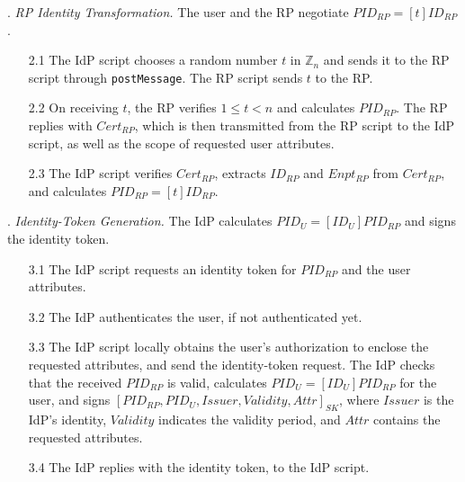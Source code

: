 . {\em RP Identity Transformation.}
The user and the RP negotiate $PID_{RP} = [t]{ID_{RP}}$.
\vspace{-\topsep}
\begin{itemize}
\setlength{\topsep}{0pt}
\setlength{\partopsep}{0pt}
\setlength{\itemsep}{0pt}
\setlength{\parsep}{0pt}
\setlength{\parskip}{0pt}
\item[2.1] The IdP script chooses a random number $t$ in $\mathbb{Z}_n$ and sends it to the RP script through \verb+postMessage+.
The RP script sends $t$ to the RP.
\item[2.2] On receiving $t$,
the RP verifies $1 \leq t < n$ and calculates $PID_{RP}$.
The RP replies with $Cert_{RP}$, which is then transmitted from the RP script to the IdP script,
    as well as the scope of requested user attributes.  %
\item[2.3] The IdP script verifies $Cert_{RP}$, extracts $ID_{RP}$ and $Enpt_{RP}$ from $Cert_{RP}$, and calculates $PID_{RP}=[t]{ID_{RP}}$.

\end{itemize}


. {\em Identity-Token Generation.}
The IdP calculates $PID_U = [ID_U]{PID_{RP}}$ and signs the identity token. %
\vspace{-\topsep}
\begin{itemize}
\setlength{\topsep}{0pt}
\setlength{\partopsep}{0pt}
\setlength{\itemsep}{0pt}
\setlength{\parsep}{0pt}
\setlength{\parskip}{0pt}
\item[3.1]
The IdP script requests an identity token for $PID_{RP}$ and the user attributes.

\item[3.2] The IdP authenticates the user, if not authenticated yet.

\item [3.3]
The IdP script locally obtains the user's authorization to enclose the requested attributes,
    and send the identity-token request.
The IdP checks that the received $PID_{RP}$ is valid,
    calculates $PID_U = [ID_U]{PID_{RP}}$ for the user,
and signs $[PID_{RP}, PID_U, Issuer, Validity, Attr]_{SK}$,
 where $Issuer$ is the IdP's identity, $Validity$ indicates the validity period, and $Attr$ contains the requested attributes.
\item[3.4] The IdP replies with the identity token, to the IdP script.
\end{itemize}

